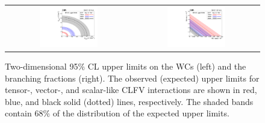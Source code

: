 \begin{figure}[tbh!]
 \begin{center}
 \begin{tabular}{cc}
 \includegraphics[width=0.48\textwidth]{figures/Part3/Results/Hist2D_WC}&
 \includegraphics[width=0.48\textwidth]{figures/Part3/Results/Hist2D_BR}\\
 \end{tabular}
 \caption{Two-dimensional 95$\%$ \ac{CL} upper limits on the \acp{WC} (left) and the branching fractions (right). The observed (expected) upper limits for tensor-, vector-, and scalar-like \ac{CLFV} interactions are shown in red, blue, and black solid (dotted) lines, respectively. The shaded bands contain $68\%$ of the distribution of the expected upper limits.}
 \label{fig:2dlimit}
 \end{center}
\end{figure}